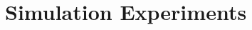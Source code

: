 \documentclass[letterpaper]{article}
\newtheorem{example}[theorem]{Example}
\newtheorem{remark}{Remark}
\begin{document}

%
%



\section{Simulation Experiments}
\end{document}
